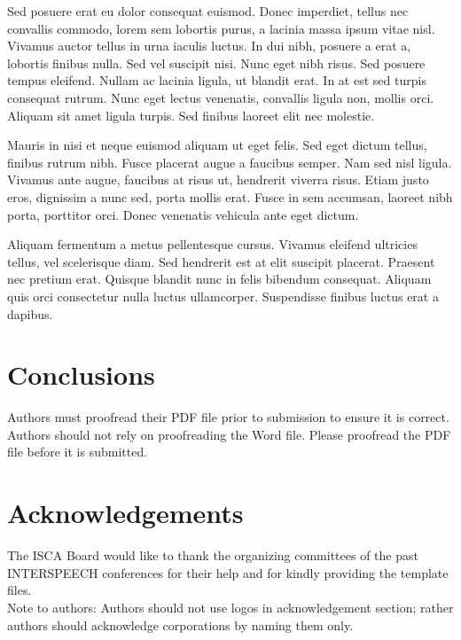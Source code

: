 \documentclass[a4paper]{article}
\begin{document}
Sed posuere erat eu dolor consequat euismod. Donec imperdiet, tellus nec convallis commodo, lorem sem lobortis purus, a lacinia massa ipsum vitae nisl. Vivamus auctor tellus in urna iaculis luctus. In dui nibh, posuere a erat a, lobortis finibus nulla. Sed vel suscipit nisi. Nunc eget nibh risus. Sed posuere tempus eleifend. Nullam ac lacinia ligula, ut blandit erat. In at est sed turpis consequat rutrum. Nunc eget lectus venenatis, convallis ligula non, mollis orci. Aliquam sit amet ligula turpis. Sed finibus laoreet elit nec molestie.

Mauris in nisi et neque euismod aliquam ut eget felis. Sed eget dictum tellus, finibus rutrum nibh. Fusce placerat augue a faucibus semper. Nam sed nisl ligula. Vivamus ante augue, faucibus at risus ut, hendrerit viverra risus. Etiam justo eros, dignissim a nunc sed, porta mollis erat. Fusce in sem accumsan, laoreet nibh porta, porttitor orci. Donec venenatis vehicula ante eget dictum.

Aliquam fermentum a metus pellentesque cursus. Vivamus eleifend ultricies tellus, vel scelerisque diam. Sed hendrerit est at elit suscipit placerat. Praesent nec pretium erat. Quisque blandit nunc in felis bibendum consequat. Aliquam quis orci consectetur nulla luctus ullamcorper. Suspendisse finibus luctus erat a dapibus.

\section{Conclusions}

Authors must proofread their PDF file prior to submission to ensure it is correct. Authors should not rely on proofreading the Word file. Please proofread the PDF file before it is submitted.

\section{Acknowledgements}

The ISCA Board would like to thank the organizing committees of the past INTERSPEECH conferences for their help and for kindly providing the template files. \\
Note to authors: Authors should not use logos in acknowledgement section; rather authors should acknowledge corporations by naming them only.





\end{document}
